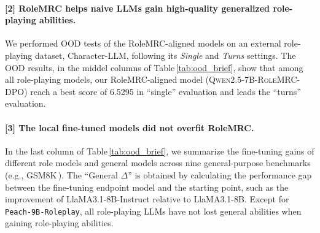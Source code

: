 \paragraph{[2] RoleMRC helps naive LLMs gain high-quality generalized role-playing abilities.} %
We performed OOD tests of the RoleMRC-aligned models on an external role-playing dataset, Character-LLM, following its \emph{Single} and \emph{Turns} settings. The OOD results, in the middel columns of Table\,\ref{tab:ood_brief}, show that among all role-playing models, our RoleMRC-aligned model (\textsc{Qwen2.5-7B-RoleMRC-DPO}) reach a best score of 6.5295 in ``single'' evaluation and leads the ``turns'' evaluation. %

\paragraph{[3] The local fine-tuned models did not overfit RoleMRC.} In the last column of Table\,\ref{tab:ood_brief}, we summarize the fine-tuning gains of different role models and general models across nine general-purpose benchmarks (e.g., GSM8K\,\cite{cobbe2021training}). The ``General $\Delta$'' is obtained by calculating the performance gap between the fine-tuning endpoint model and the starting point, such as the improvement of LlaMA3.1-8B-Instruct relative to LlaMA3.1-8B. Except for \texttt{Peach-9B-Roleplay}, all role-playing LLMs have not lost general abilities when gaining role-playing abilities.
